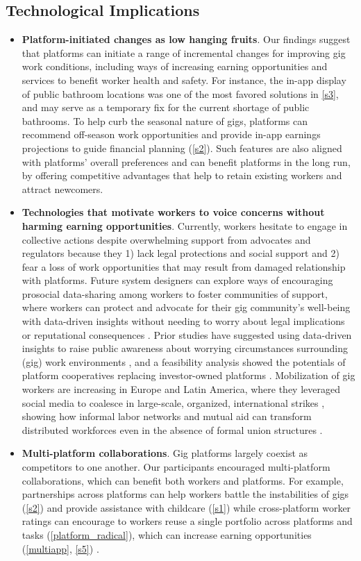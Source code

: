 \subsection{Technological Implications}
\begin{itemize}
  \item \textbf{Platform-initiated changes as low hanging fruits}. Our findings suggest that platforms can initiate a range of incremental changes for improving gig work conditions, including ways of increasing earning opportunities and services to benefit worker health and safety. For instance, the in-app display of public bathroom locations was one of the most favored solutions in \ref{s3}, and may serve as a temporary fix for the current shortage of public bathrooms. To help curb the seasonal nature of gigs, platforms can recommend off-season work opportunities and provide in-app earnings projections to guide financial planning (\ref{s2}). Such features are also aligned with platforms' overall preferences and can benefit platforms in the long run, by offering competitive advantages that help to retain existing workers and attract newcomers.   
  \item \textbf{Technologies that motivate workers to voice concerns without harming earning opportunities}. Currently, workers hesitate to engage in collective actions despite overwhelming support from advocates and regulators because they 1) lack legal protections and social support and 2) fear a loss of work opportunities that may result from damaged relationship with platforms. Future system designers can explore ways of encouraging prosocial data-sharing among workers to foster communities of support, where workers can protect and advocate for their gig community's well-being with data-driven insights without needing to worry about legal implications or reputational consequences \cite{end}. Prior studies have suggested using data-driven insights to raise public awareness about worrying circumstances surrounding (gig) work environments \cite{khovanskaya2019tools, end}, and a feasibility analysis showed the potentials of platform cooperatives replacing investor-owned platforms \cite{bunders2022feasibility}. 
  Mobilization of gig workers are increasing in Europe \cite{cini2022or} and Latin America, where they leveraged social media to coalesce in large-scale, organized, international strikes \cite{boss}, showing how informal labor networks and mutual aid can transform distributed workforces even in the absence of formal union structures \cite{qadri2021s}. 
  \item \textbf{Multi-platform collaborations}. Gig platforms largely coexist as competitors to one another. Our participants encouraged multi-platform collaborations, which can benefit both workers and platforms. For example, partnerships across platforms can help workers battle the instabilities of gigs (\ref{s2}) and provide assistance with childcare (\ref{s1}) while cross-platform worker ratings can encourage to workers reuse a single portfolio across platforms and tasks (\ref{platform_radical}), which can increase earning opportunities (\ref{multiapp}, \ref{s5}) \cite{personal}. 

\end{itemize}
